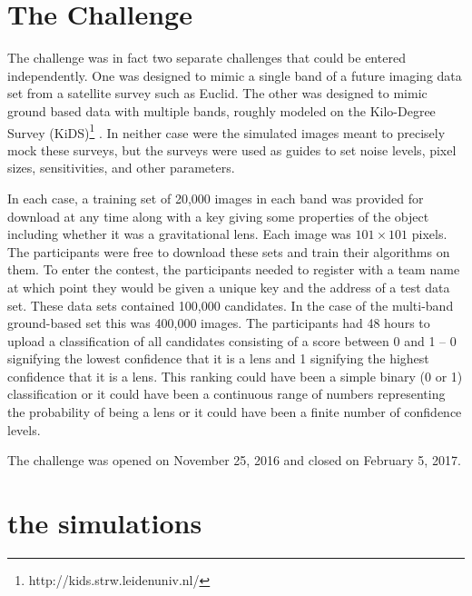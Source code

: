 \documentclass[useAMS,usenatbib]{mnras}
\begin{document}
\section{The Challenge}
\label{sec:challenge}

The challenge was in fact two separate challenges that could be entered independently.  One was designed to mimic a single band of a future imaging data set from a satellite survey such as Euclid.  The other was designed to mimic ground based data with multiple bands, roughly modeled on the Kilo-Degree Survey (KiDS)\footnote{http://kids.strw.leidenuniv.nl/} \citep{2013ExA....35...25D}. In neither case were the simulated images meant to precisely mock these surveys, but the surveys were used as guides to set noise levels, pixel sizes, sensitivities, and other parameters.

In each case, a training set of 20,000 images in each band was provided for download at any time along with a key giving some properties of the object including whether it was a gravitational lens.  Each image was $101\times101$ pixels.  The participants were free to download these sets and train their algorithms on them.  To enter the contest, the participants needed to register with a team name at which point they would be given a unique key and the address of a test data set.  These data sets contained 100,000 candidates.  In the case of the multi-band ground-based set this was 400,000 images. The participants had 48 hours to upload a classification of all candidates consisting of a score between 0 and 1 -- 0 signifying the lowest confidence that it is a lens and 1 signifying the highest confidence that it is a lens.  This ranking could have been a simple binary (0 or 1) classification  or it could have been a continuous range of numbers representing the probability of being a lens or it could have been a finite number of confidence levels.  

The challenge was opened on November 25, 2016 and closed on February 5, 2017.

\section{the simulations}
\label{sec:simulation}
\end{document}
